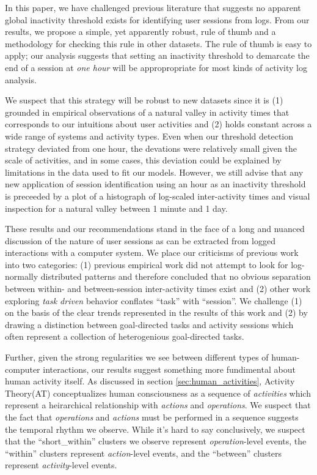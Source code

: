 In this paper, we have challenged previous literature that suggests no apparent global inactivity threshold exists for identifying user sessions from logs.  From our results, we propose a simple, yet apparently robust, rule of thumb and a methodology for checking this rule in other datasets.  The rule of thumb is easy to apply; our analysis suggests that setting an inactivity threshold to demarcate the end of a session at \emph{one hour} will be appropropriate for most kinds of activity log analysis.

We suspect that this strategy will be robust to new datasets since it is (1) grounded in empirical observations of a natural valley in activity times that corresponds to our intuitions about user activities and (2) holds constant across a wide range of systems and activity types. Even when our threshold detection strategy deviated from one hour, the devations were relatively small given the scale of activities, and in some cases, this deviation could be explained by limitations in the data used to fit our models.  However, we still advise that any new application of session identification using an hour as an inactivity threshold is preceeded by a plot of a histograph of log-scaled inter-activity times and visual inspection for a natural valley between 1 minute and 1 day.

These results and our recommendations stand in the face of a long and nuanced discussion of the nature of user sessions as can be extracted from logged interactions with a computer system.  We place our criticisms of previous work into two categories: (1) previous empirical work did not attempt to look for log-normally distributed patterns and therefore concluded that no obvious separation between within- and between-session inter-activity times exist\cite{mehrzadi2012onextracting}\cite{catledge1995characterizing} and (2) other work exploring \emph{task driven} behavior conflates ``task'' with ``session''.  We challenge (1) on the basis of the clear trends represented in the results of this work and (2) by drawing a distinction between goal-directed tasks and activity sessions which often represent a collection of heterogenious goal-directed tasks.

Further, given the strong regularities we see between different types of human-computer interactions, our results suggest something more fundimental about human activity itself.  As discussed in section \ref{sec:human_activities}, Activity Theory(AT) conceptualizes human consciousness as a sequence of \emph{activities} which represent a heirarchical relationship with \emph{actions} and \emph{operations}.  We suspect that the fact that \emph{operations} and \emph{actions} must be performed in a sequence suggests the temporal rhythm we observe.  While it's hard to say conclusively, we suspect that the ``short\_within'' clusters we observe represent \emph{operation}-level events, the ``within'' clusters represent \emph{action}-level events, and the ``between'' clusters represent \emph{activity}-level events.

